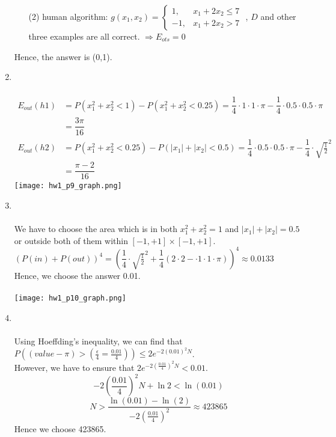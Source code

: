 \documentclass{article}
\begin{document}
\begin{enumerate}
\begin{enumerate}
        \item[(2)] human algorithm:
        $g(x_1,x_2) = \left\{
            \begin{array}{lr}
                1,&x_1 + 2x_2 \leq 7\\
                -1,&x_1 + 2x_2 > 7
            \end{array}
        \right.$
        , $D$ and other three examples are all correct. $\Rightarrow E_{ots} = 0$
    \end{enumerate}
    Hence, the answer is (0,1).\\
    \item \text{[d]}\\%
    \\\begin{align*}
        E_{out}(h1) &= P(x_1^2 + x_2^2 < 1) - P(x_1^2 + x_2^2 < 0.25) = \dfrac{1}{4}\cdot1\cdot1\cdot\pi - \dfrac{1}{4}\cdot0.5\cdot0.5\cdot\pi\\
        &= \dfrac{3\pi}{16}\\
        E_{out}(h2) &= P(x_1^2 + x_2^2 < 0.25) - P(|x_1| + |x_2| < 0.5) = \dfrac{1}{4}\cdot0.5\cdot0.5\cdot\pi - \dfrac{1}{4}\cdot\sqrt{\frac{1}{2}}^2\\
        &= \dfrac{\pi - 2}{16}
    \end{align*}
    \texttt{[image: hw1\_p9\_graph.png]}

    \item \text{[b]}\\%
    \\We have to choose the area which is in both $x_1^2 + x_2^2 = 1$ and $|x_1| + |x_2| = 0.5$ or outside both of them within $[-1,+1]\times[-1,+1]$.\\
    $\left(P(in) + P(out)\right)^4 = \left(\dfrac{1}{4}\cdot\sqrt{\frac{1}{2}}^2 + \dfrac{1}{4}(2\cdot2 - \cdot1\cdot1\cdot\pi)\right)^4 \approx 0.0133$\\
    Hence, we choose the answer 0.01.\\\\
    \texttt{[image: hw1\_p10\_graph.png]}

    \item \text{[d]}\\%
    \\Using Hoeffding’s inequality, we can find that $P((value - \pi) > (\frac{\epsilon}{4} = \frac{0.01}{4})) \leq 2e^{-2(0.01)^2N}$.\\However, we have to ensure that
    $2e^{-2(\frac{0.01}{4})^2N} < 0.01$.
    \[-2(\frac{0.01}{4})^2N + \ln{2} < \ln{(0.01)}\]
    \[N > \frac{\ln{(0.01)} - \ln{(2)}}{-2(\frac{0.01}{4})^2}\approx 423865\]
    Hence we choose 423865.


\end{enumerate}
\end{document}
